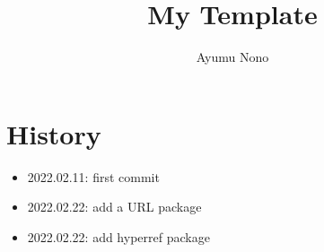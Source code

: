 \documentclass[dvipdfmx,autodetect-engine]{article}
\title{My Template}
\author{Ayumu Nono}
\begin{document}
\maketitle


\section{History}
\begin{itemize}
    \item 2022.02.11: first commit
    \item 2022.02.22: add a URL package
    \item 2022.02.22: add hyperref package
\end{itemize}
\end{document}
